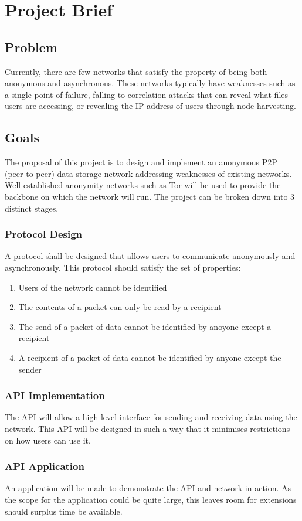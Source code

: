 \section{Project Brief}

\subsection*{Problem}
Currently, there are few networks that satisfy the property of being both anonymous and asynchronous. These networks typically have weaknesses such as a single point of failure, falling to correlation attacks that can reveal what files users are accessing, or revealing the IP address of users through node harvesting.

\subsection*{Goals}
The proposal of this project is to design and implement an anonymous P2P (peer-to-peer) data storage network addressing weaknesses of existing networks. Well-established anonymity networks such as Tor will be used to provide the backbone on which the network will run.
The project can be broken down into 3 distinct stages.

\subsubsection*{Protocol Design}
A protocol shall be designed that allows users to communicate anonymously and asynchronously. This protocol should satisfy the set of properties:
\begin{enumerate}
	\item Users of the network cannot be identified
	\item The contents of a packet can only be read by a recipient
	\item The send of a packet of data cannot be identified by anoyone except a recipient
	\item A recipient of a packet of data cannot be identified by anyone except the sender
\end{enumerate}
\subsubsection*{API Implementation}
The API will allow a high-level interface for sending and receiving data using the network. This API will be designed in such a way that it minimises restrictions on how users can use it.
\subsubsection*{API Application}
An application will be made to demonstrate the API and network in action. As the scope for the application could be quite large, this leaves room for extensions should surplus time be available.
